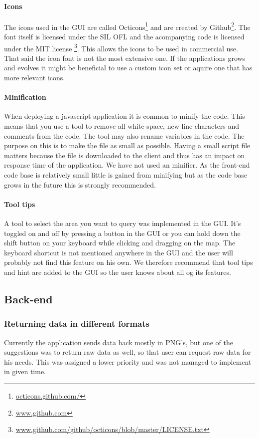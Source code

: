 \documentclass[11pt,a4paper,titlepage,oneside]{report}
\begin{document}
\paragraph{Icons}
The icons used in the GUI are called Octicons\footnote{\url{octicons.github.com/}} and are created by Github\footnote{\url{www.github.com}}. The font itself is licensed under the SIL OFL and the acompanying code is licensed under the MIT license \footnote{\url{www.github.com/github/octicons/blob/master/LICENSE.txt}}. This allows the icons to be used in commercial use. That said the icon font is not the most extensive one. If the applications grows and evolves it might be beneficial to use a custom icon set or aquire one that has more relevant icons.

\paragraph{Minification}
When deploying a javascript application it is common to minify the code. This means that you use a tool to remove all white space, new line characters and comments from the code. The tool may also rename variables in the code. The purpose on this is to make the file as small as possible. Having a small script file matters because the file is downloaded to the client and thus has an impact on response time of the application. We have not used an minifier. As the \gls{front-end} code base is relatively small little is gained from minifying but as the code base grows in the future this is strongly recommended.

\paragraph{Tool tips}
A tool to select the area you want to query was implemented in the \gls{GUI}. It's toggled on and off by pressing a button in the \gls{GUI} or you can hold down the shift button on your keyboard while clicking and dragging on the map. The keyboard shortcut is not mentioned anywhere in the \gls{GUI} and the user will probably not find this feature on his own. We therefore recommend that tool tips and hint are added to the \gls{GUI} so the user knows about all og its features.


\subsection{Back-end}

\subsubsection{Returning data in different formats}
Currently the application sends data back mostly in \gls{PNG}'s, but one of the suggestions was to return raw data as well, so that user can request raw data for his needs. This was assigned a lower priority and was not managed to implement in given time.
\end{document}
